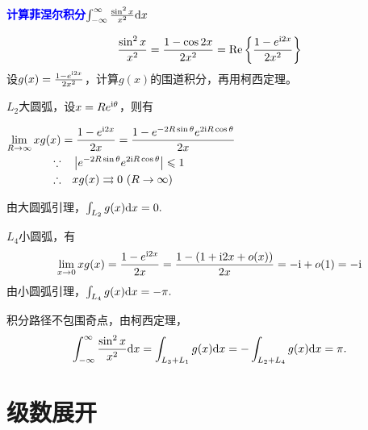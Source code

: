 \documentclass[UTF8,12pt]{ctexart}
\newcommand{\I}{{\rm i}}
\newcommand{\tblue}{\textcolor{blue}}
\begin{document}
\begin{ebox}
    \tblue{\bf 计算菲涅尔积分$\int_{-\infty}^\infty \frac{\sin^2x}{x^2}{\rm d}x$}\

    \begin{equation}
        \frac{\sin^2x}{x^2}=\frac{1-\cos 2x}{2x^2}={\rm Re}\left\{\frac{1-e^{\I 2x}}{2x^2}\right\}
    \end{equation}
    设$g(x)=\frac{1-e^{\I 2x}}{2x^2}$，计算$g(x)$的围道积分，再用柯西定理。

    \begin{vwcol}[widths={0.54,0.35},rule=0pt]
        $L_2$大圆弧，设$x=Re^{\I\theta}$，则有

        $\begin{aligned}
            \lim_{R\rightarrow\infty}xg(x)
                &=\frac{1-e^{\I 2x}}{2x}=\frac{1-e^{-2R\sin\theta}e^{2\I R\cos\theta}}{2x} \\
            \because&\quad \left|e^{-2R\sin\theta}e^{2\I R\cos\theta}\right|\leqslant 1 \\
            \therefore&\quad xg(x)\rightrightarrows 0\ (R\rightarrow\infty)
        \end{aligned}$

    \end{vwcol}
    由大圆弧引理，$\int_{L_2}g(x){\rm d}x=0.$

    $L_4$小圆弧，有
    $$\lim_{x\rightarrow 0}xg(x)
    =\frac{1-e^{\I 2x}}{2x}=\frac{1-\left(1+\I 2x+o(x)\right)}{2x}=-\I+o(1)=-\I$$
    由小圆弧引理，$\int_{L_4}g(x){\rm d}x=-\pi.$

    积分路径不包围奇点，由柯西定理，
    $$\int_{-\infty}^\infty \frac{\sin^2x}{x^2}{\rm d}x=\int_{L_3+L_1}g(x){\rm d}x=-\int_{L_2+L_4}g(x){\rm d}x=\pi.$$
\end{ebox}


\newpage
\section{级数展开}
\end{document}
